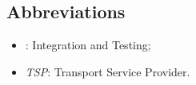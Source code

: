 \subsection{Abbreviations}
	\begin{itemize}
	\item {}: Integration and Testing;
   	\item \textit{TSP}: Transport Service Provider. 
	\end{itemize}
